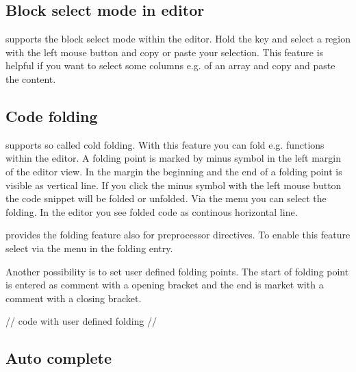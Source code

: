 
\subsection{Block select mode in editor}

\codeblocks supports the block select mode within the editor. Hold the key  and select a region with the left mouse button and copy or paste your selection. This feature is helpful if you want to select some columns e.g. of an array and copy and paste the content.


\subsection{Code folding}

\codeblocks supports so called cold folding. With this feature you can fold e.g. functions within the \codeblocks editor. A folding point is marked by minus symbol in the left margin of
the editor view. In the margin the beginning and the end of a folding point is visible as vertical line. If you click the minus symbol with the left mouse button the code snippet will be folded or unfolded. Via the menu  you can select the folding. In the editor you see folded code as continous horizontal line.


\codeblocks provides the folding feature also for preprocessor directives. To enable this feature select  via the menu  in the folding entry.

Another possibility is to set user defined folding points. The start of folding point is entered as comment with a opening bracket and the end is market with a comment with a closing bracket.

\begin{code}
//{
code with user defined folding
//}
\end{code}

\subsection{Auto complete}

